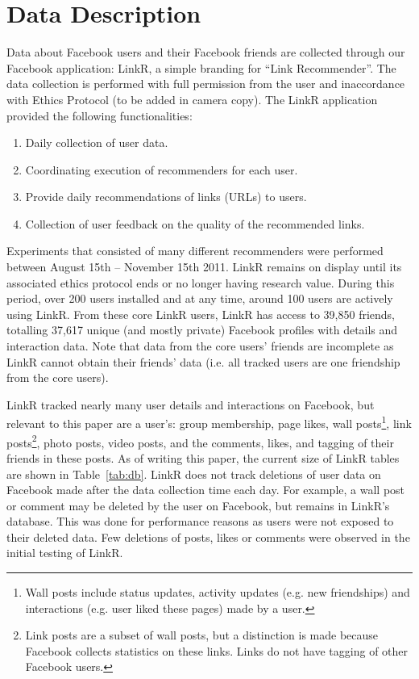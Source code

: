 \documentclass[letterpaper]{article}
\begin{document}
\section{Data Description}


Data about Facebook users and their Facebook friends are collected through our Facebook application: LinkR, a simple branding for ``Link Recommender''. The data collection is performed with full permission from the user and inaccordance with Ethics Protocol (to be added in camera copy). The LinkR application provided the following functionalities:
\begin{enumerate}
\item Daily collection of user data.
\item Coordinating execution of recommenders for each user.
\item Provide daily recommendations of links (URLs) to users.
\item Collection of user feedback on the quality of the recommended links.
\end{enumerate}
Experiments that consisted of many different recommenders were performed between August 15th -- November 15th 2011. LinkR remains on display until its associated ethics protocol ends or no longer having research value. During this period, over 200 users installed and at any time, around 100 users are actively using LinkR. From these core LinkR users, LinkR has access to 39,850 friends, totalling 37,617 unique (and mostly private) Facebook profiles with details and interaction data. Note that data from the core users' friends are incomplete as LinkR cannot obtain their friends' data (i.e. all tracked users are one friendship from the core users).


LinkR tracked nearly many user details and interactions on Facebook, but relevant to this paper are a user's: group membership, page likes, wall posts\footnote{Wall posts include status updates, activity updates (e.g. new friendships) and interactions (e.g. user liked these pages) made by a user.}, link posts\footnote{Link posts are a subset of wall posts, but a distinction is made because Facebook collects statistics on these links. Links do not have tagging of other Facebook users.}, photo posts, video posts, and the comments, likes, and tagging of their friends in these posts. As of writing this paper, the current size of LinkR tables are shown in Table~\ref{tab:db}. LinkR does not track deletions of user data on Facebook made after the data collection time each day. For example, a wall post or comment may be deleted by the user on Facebook, but remains in LinkR's database. This was done for performance reasons as users were not exposed to their deleted data. Few deletions of posts, likes or comments were observed in the initial testing of LinkR.
\end{document}

